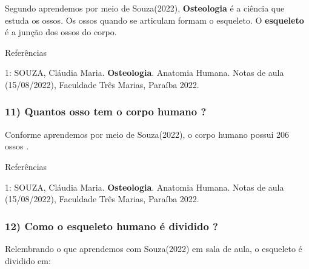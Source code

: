 \documentclass[
]{book}
\begin{document}
Segundo aprendemos por meio de Souza(2022), \textbf{Osteologia} é a ciência que estuda os ossos. Os ossos quando se articulam formam o esqueleto. O \textbf{esqueleto} é a junção dos ossos do corpo.

Referências

1: SOUZA, Cláudia Maria. \textbf{Osteologia}. Anatomia Humana. Notas de aula (15/08/2022), Faculdade Três Marias, Paraíba 2022.

\hypertarget{quantos-osso-tem-o-corpo-humano}{%
\subsubsection*{11) Quantos osso tem o corpo humano ?}\label{quantos-osso-tem-o-corpo-humano}}

Conforme aprendemos por meio de Souza(2022), o corpo humano possui 206 ossos .

Referências

1: SOUZA, Cláudia Maria. \textbf{Osteologia}. Anatomia Humana. Notas de aula (15/08/2022), Faculdade Três Marias, Paraíba 2022.

\hypertarget{como-o-esqueleto-humano-uxe9-dividido}{%
\subsubsection*{12) Como o esqueleto humano é dividido ?}\label{como-o-esqueleto-humano-uxe9-dividido}}

Relembrando o que aprendemos com Souza(2022) em sala de aula, o esqueleto é dividido em:
\end{document}
